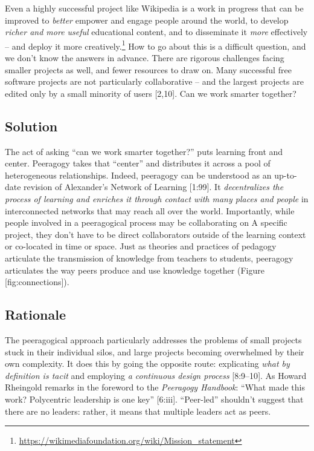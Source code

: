 Even a highly successful project like Wikipedia is a work in progress
that can be improved to \emph{better} empower and engage people around
the world, to develop \emph{richer and more useful} educational content,
and to disseminate it \emph{more} effectively -- and deploy it more
creatively.\footnote{\url{https://wikimediafoundation.org/wiki/Mission_statement}}
How to go about this is a difficult question, and we don't know the
answers in advance. There are rigorous challenges facing smaller
projects as well, and fewer resources to draw on. Many successful free
software projects are not particularly collaborative -- and the largest
projects are edited only by a small minority of users {{[}2,10{]}}. Can
we work smarter together?

\hypertarget{solution}{%
\subsection{Solution}\label{solution}}

The act of asking ``can we work smarter together?'' puts learning front
and center. Peeragogy takes that ``center'' and distributes it across a
pool of heterogeneous relationships. Indeed, peeragogy can be understood
as an up-to-date revision of Alexander's {{Network of Learning}}
{{[}1:99{]}}. It \emph{decentralizes the process of learning and
enriches it through contact with many places and people} in
interconnected networks that may reach all over the world. Importantly,
while people involved in a peeragogical process may be collaborating on
{{A specific project}}, they don't have to be direct collaborators
outside of the learning context or co-located in time or space. Just as
theories and practices of pedagogy articulate the transmission of
knowledge from teachers to students, peeragogy articulates the way peers
produce and use knowledge together (Figure {[}fig:connections{]}).

\hypertarget{rationale}{%
\subsection{Rationale}\label{rationale}}

The peeragogical approach particularly addresses the problems of small
projects stuck in their individual silos, and large projects becoming
overwhelmed by their own complexity. It does this by going the opposite
route: explicating \emph{what by definition is tacit} and employing
\emph{a continuous design process} {{[}8:9--10{]}}. As Howard Rheingold
remarks in the foreword to the \emph{Peeragogy Handbook}: ``What made
this work? Polycentric leadership is one key'' {{[}6:iii{]}}.
``Peer-led'' shouldn't suggest that there are no leaders: rather, it
means that multiple leaders act as peers.

